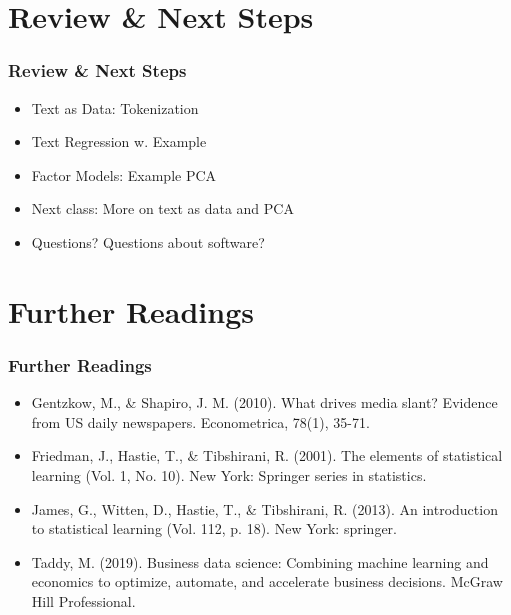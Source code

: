 \documentclass[
  shownotes,
  xcolor={svgnames},
  hyperref={colorlinks,citecolor=DarkBlue,linkcolor=DarkRed,urlcolor=DarkBlue}
  , aspectratio=169]{beamer}
\begin{document}
\section{Review
 \& Next Steps}
\begin{frame}
\frametitle{Review \& Next Steps}
  
\begin{itemize} 
  
\item Text as Data: Tokenization
\medskip
\item Text Regression w. Example
\medskip
\item Factor Models: Example PCA
    \bigskip  
  \item  Next class:  More on text as data and PCA


\bigskip  
\item Questions? Questions about software? 

\end{itemize}
\end{frame}

\section{Further Readings}
\begin{frame}
\frametitle{Further Readings}

\begin{itemize}

  \item Gentzkow, M., \& Shapiro, J. M. (2010). What drives media slant? Evidence from US daily newspapers. Econometrica, 78(1), 35-71.
  \medskip
  \item Friedman, J., Hastie, T., \& Tibshirani, R. (2001). The elements of statistical learning (Vol. 1, No. 10). New York: Springer series in statistics.
  \medskip
  \item James, G., Witten, D., Hastie, T., \& Tibshirani, R. (2013). An introduction to statistical learning (Vol. 112, p. 18). New York: springer.
  \medskip
  \item Taddy, M. (2019). Business data science: Combining machine learning and economics to optimize, automate, and accelerate business decisions. McGraw Hill Professional.

  
\end{itemize}

\end{frame}
\end{document}
